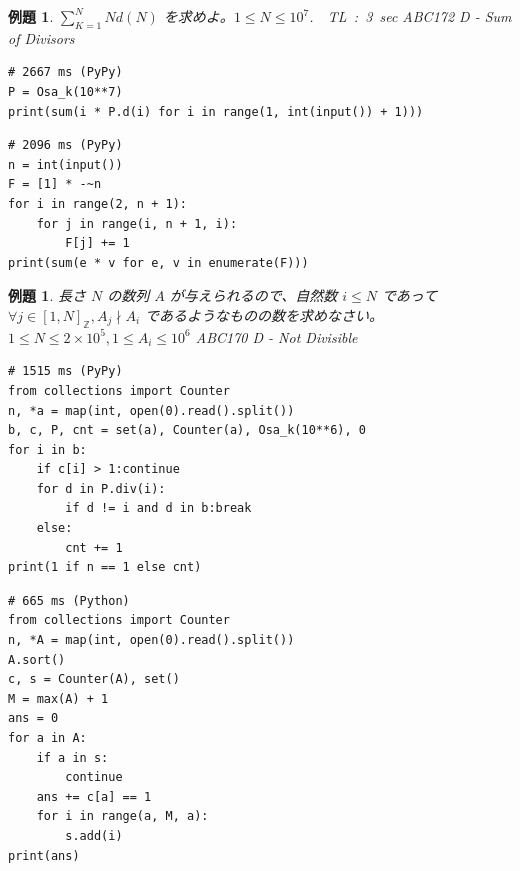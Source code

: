 \documentclass[12pt, a4j]{ltjsarticle}
\newtheorem{exm}[thm]{例題}
\newcommand*{\ZZ}{\mathbb{Z}}
\begin{document}
\vspace{1cm}

\begin{exm}
$\displaystyle\sum_{K=1}^N Nd(N)$ を求めよ。$1\le N\le 10^7$.\upshape\ \ TL\ :\ 3\ sec\ \  \hspace{\fill} ABC172 D - Sum of Divisors\\
\begin{lstlisting}
# 2667 ms (PyPy)
P = Osa_k(10**7)
print(sum(i * P.d(i) for i in range(1, int(input()) + 1)))
\end{lstlisting}
\begin{lstlisting}
# 2096 ms (PyPy)
n = int(input())
F = [1] * -~n
for i in range(2, n + 1):
    for j in range(i, n + 1, i):
        F[j] += 1
print(sum(e * v for e, v in enumerate(F)))
\end{lstlisting}
\end{exm}

\vspace{1cm}

\begin{exm} 長さ $N$ の数列 $A$ が与えられるので、自然数 $i \le N$ であって $\forall j\in[1,N]_\ZZ, A_j \nmid A_i$ であるようなものの数を求めなさい。$1 \leq N \leq 2 \times 10^5, 1 \leq A_i \leq  10^6$\upshape \hspace{\fill} ABC170 D - Not Divisible\\
\begin{lstlisting}
# 1515 ms (PyPy)
from collections import Counter
n, *a = map(int, open(0).read().split())
b, c, P, cnt = set(a), Counter(a), Osa_k(10**6), 0
for i in b:
    if c[i] > 1:continue
    for d in P.div(i):
        if d != i and d in b:break
    else:
        cnt += 1
print(1 if n == 1 else cnt)
\end{lstlisting}
\begin{lstlisting}
# 665 ms (Python)
from collections import Counter
n, *A = map(int, open(0).read().split())
A.sort()
c, s = Counter(A), set()
M = max(A) + 1
ans = 0
for a in A:
    if a in s:
        continue
    ans += c[a] == 1
    for i in range(a, M, a):
        s.add(i)
print(ans)
\end{lstlisting}
\end{exm}

\vspace{1cm}
\end{document}
